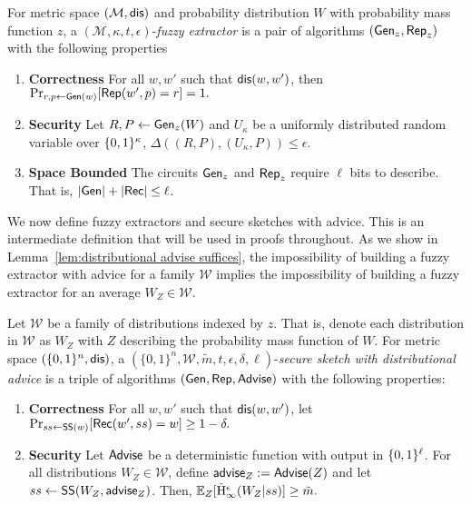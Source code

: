 \begin{definition}
For metric space $(\mathcal{M}, \mathsf{dis})$ and probability distribution $W$ with probability mass function $z$, a $(\mathcal{M}, \kappa, t, \epsilon)$-\emph{fuzzy extractor} is a pair of algorithms $({\mathsf{Gen}}_z, {\mathsf{Rep}}_z)$ with the following properties 
\begin{enumerate} 
\itemsep0em
\item \textbf{Correctness} For all $w, w'$ such that $\mathsf{dis}(w, w')$, then 
$\Pr_{r, p \leftarrow {\ensuremath{\mathsf{Gen}}}(w)}[{\mathsf{Rep}}(w', p) = r]=1.$ 
\item \textbf{Security} Let $R, P \leftarrow {\ensuremath{\mathsf{Gen}}}_z(W)$ and $U_\kappa$ be a uniformly distributed random variable over $\{0, 1\}^\kappa$, $\Delta((R, P), (U_\kappa, P))\le \epsilon.$
\item  \textbf{Space Bounded} The circuits ${\mathsf{Gen}}_z$ and ${\mathsf{Rep}}_z$ require $\ell$ bits to describe.  That is, $|{\mathsf{Gen}}| +|{\mathsf{Rec}}|\le \ell$.
\end{enumerate}
\label{def:fe}
\end{definition}

\noindent
We now define fuzzy extractors and secure sketches with advice.  This is an intermediate definition that will be used in proofs throughout.  As we show in Lemma~\ref{lem:distributional advise suffices}, the impossibility of building a fuzzy extractor with advice for a family $\mathcal{W}$ implies the impossibility of building a fuzzy extractor for an average $W_Z\in\mathcal{W}$.

\begin{definition}
\label{def:ss distributional}
Let $\mathcal{W}$ be a family of distributions indexed by $z$.  That is, denote each distribution in $\mathcal{W}$ as $W_Z$ with $Z$ describing the probability mass function of $W$.  
For metric space $(\{0,1\}^n, \mathsf{dis})$, a $(\{0,1\}^n, \mathcal{W}, \tilde{m}, t, \epsilon, \delta, \ell)$-\emph{secure sketch with distributional advice} is a triple of algorithms $({\mathsf{Gen}}, {\mathsf{Rep}}, {\mathsf{Advise}})$ with the following properties:
\begin{enumerate} 
\itemsep0em
\item \textbf{Correctness} For all $w, w'$ such that $\mathsf{dis}(w, w')$, let $\Pr_{ss \leftarrow {\ensuremath{\mathsf{SS}}}(w)}[{\mathsf{Rec}}(w', ss) = w]\ge 1-\delta.$
\item \textbf{Security} Let ${\mathsf{Advise}}$ be a deterministic function with output in $\{0, 1\}^\ell$.  For all distributions $W_Z \in \mathcal{W}$, define ${\mathsf{advise}}_Z:= {\mathsf{Advise}}(Z)$ and let $ss \leftarrow {\ensuremath{\mathsf{SS}}}(W_Z, {\mathsf{advise}}_Z)$. Then,
$
\operatorname*{\mathbb{E}}_{Z} [\tilde{\mathrm{H}}_\infty^\epsilon(W_Z| ss)] \ge \tilde{m}.
$
\end{enumerate}
\end{definition}


